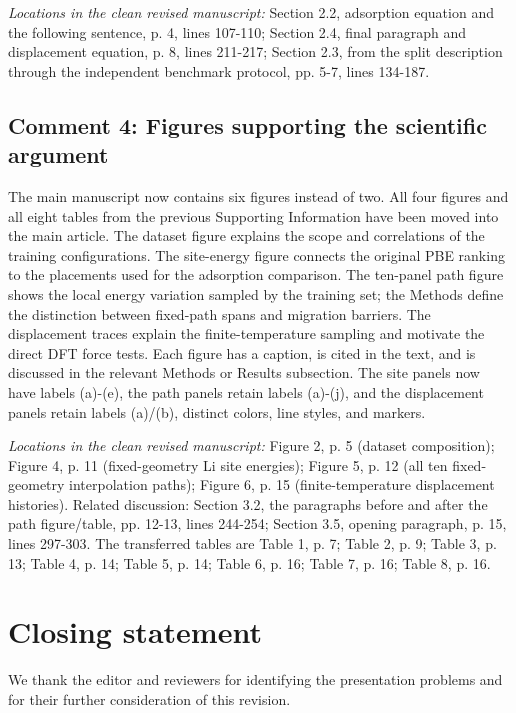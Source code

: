 \documentclass[11pt]{article}
\begin{document}
\textit{Locations in the clean revised manuscript:} Section 2.2, adsorption equation and the following sentence, p. 4, lines 107-110; Section 2.4, final paragraph and displacement equation, p. 8, lines 211-217; Section 2.3, from the split description through the independent benchmark protocol, pp. 5-7, lines 134-187.
\subsection*{Comment 4: Figures supporting the scientific argument}
The main manuscript now contains six figures instead of two. All four figures and all eight tables from the previous Supporting Information have been moved into the main article. The dataset figure explains the scope and correlations of the training configurations. The site-energy figure connects the original PBE ranking to the placements used for the adsorption comparison. The ten-panel path figure shows the local energy variation sampled by the training set; the Methods define the distinction between fixed-path spans and migration barriers. The displacement traces explain the finite-temperature sampling and motivate the direct DFT force tests. Each figure has a caption, is cited in the text, and is discussed in the relevant Methods or Results subsection. The site panels now have labels (a)-(e), the path panels retain labels (a)-(j), and the displacement panels retain labels (a)/(b), distinct colors, line styles, and markers.

\textit{Locations in the clean revised manuscript:} Figure 2, p. 5 (dataset composition); Figure 4, p. 11 (fixed-geometry Li site energies); Figure 5, p. 12 (all ten fixed-geometry interpolation paths); Figure 6, p. 15 (finite-temperature displacement histories). Related discussion: Section 3.2, the paragraphs before and after the path figure/table, pp. 12-13, lines 244-254; Section 3.5, opening paragraph, p. 15, lines 297-303. The transferred tables are Table 1, p. 7; Table 2, p. 9; Table 3, p. 13; Table 4, p. 14; Table 5, p. 14; Table 6, p. 16; Table 7, p. 16; Table 8, p. 16.
\section*{Closing statement}
We thank the editor and reviewers for identifying the presentation problems and for their further consideration of this revision.
\end{document}

